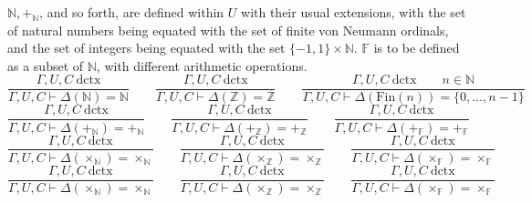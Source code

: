 \documentclass[11pt]{article}
\begin{document}
$\mathbb{N}, +_\mathbb{N}$, and so forth, are defined within $U$ with their
usual extensions, with the set of natural numbers being equated with the set of
finite von Neumann ordinals, and the set of integers being equated with
the set $\{-1,1\} \times \mathbb{N}$. $\mathbb{F}$ is to be defined as a
subset of $\mathbb{N}$, with different arithmetic operations.
\begin{equation}
	\frac{\Gamma,U,C\ \text{dctx}}
	{\Gamma,U,C \vdash \Delta(\mathbb{N}) = \mathbb{N}}
	\qquad
	\frac{\Gamma,U,C\ \text{dctx}}
	{\Gamma,U,C \vdash \Delta(\mathbb{Z}) = \mathbb{Z}}
	\qquad
	\frac{\Gamma,U,C\ \text{dctx}
	\qquad n \in \mathbb{N}}
	{\Gamma,U,C \vdash \Delta(\text{Fin}(n)) = \{0,...,n-1\}}
\end{equation}
\begin{equation}
	\frac{\Gamma,U,C\ \text{dctx}}
	{\Gamma,U,C \vdash \Delta(+_{\mathbb{N}}) = +_{\mathbb{N}}}
	\qquad
	\frac{\Gamma,U,C\ \text{dctx}}
	{\Gamma,U,C \vdash \Delta(+_{\mathbb{Z}}) = +_{\mathbb{Z}}}
	\qquad
	\frac{\Gamma,U,C\ \text{dctx}}
	{\Gamma,U,C \vdash \Delta(+_{\mathbb{F}}) = +_{\mathbb{F}}}
\end{equation}
\begin{equation}
	\frac{\Gamma,U,C\ \text{dctx}}
	{\Gamma,U,C \vdash \Delta(\times_{\mathbb{N}}) = \times_{\mathbb{N}}}
	\qquad
	\frac{\Gamma,U,C\ \text{dctx}}
	{\Gamma,U,C \vdash \Delta(\times_{\mathbb{Z}}) = \times_{\mathbb{Z}}}
	\qquad
	\frac{\Gamma,U,C\ \text{dctx}}
	{\Gamma,U,C \vdash \Delta(\times_{\mathbb{F}}) = \times_{\mathbb{F}}}
\end{equation}
\begin{equation}
	\frac{\Gamma,U,C\ \text{dctx}}
	{\Gamma,U,C \vdash \Delta(\times_{\mathbb{N}}) = \times_{\mathbb{N}}}
	\qquad
	\frac{\Gamma,U,C\ \text{dctx}}
	{\Gamma,U,C \vdash \Delta(\times_{\mathbb{Z}}) = \times_{\mathbb{Z}}}
	\qquad
	\frac{\Gamma,U,C\ \text{dctx}}
	{\Gamma,U,C \vdash \Delta(\times_{\mathbb{F}}) = \times_{\mathbb{F}}}
\end{equation}
\end{document}
